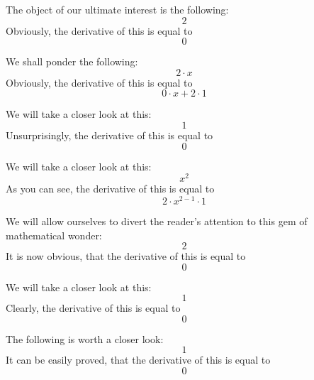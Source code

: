 \documentclass{article}
\begin{document}
The object of our ultimate interest is the following:
\begin{equation}
2 
\end{equation}
Obviously, the derivative of this is equal to
\begin{equation}
0 
\end{equation}

We shall ponder the following:
\begin{equation}
2 \cdot x 
\end{equation}
Obviously, the derivative of this is equal to
\begin{equation}
0 \cdot x + 2 \cdot 1 
\end{equation}

We will take a closer look at this:
\begin{equation}
1 
\end{equation}
Unsurprisingly, the derivative of this is equal to
\begin{equation}
0 
\end{equation}

We will take a closer look at this:
\begin{equation}
x ^{2 } 
\end{equation}
As you can see, the derivative of this is equal to
\begin{equation}
2 \cdot x ^{2 - 1 } \cdot 1 
\end{equation}

We will allow ourselves to divert the reader's attention to this gem of mathematical wonder:
\begin{equation}
2 
\end{equation}
It is now obvious, that the derivative of this is equal to
\begin{equation}
0 
\end{equation}

We will take a closer look at this:
\begin{equation}
1 
\end{equation}
Clearly, the derivative of this is equal to
\begin{equation}
0 
\end{equation}

The following is worth a closer look:
\begin{equation}
1 
\end{equation}
It can be easily proved, that the derivative of this is equal to
\begin{equation}
0 
\end{equation}
\end{document}
